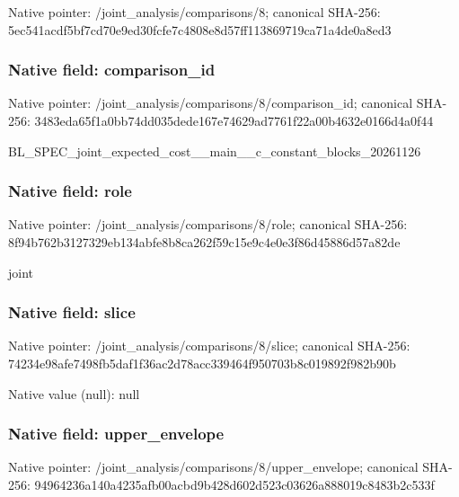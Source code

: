 \documentclass[10pt,a4paper]{article}
\begin{document}
Native pointer: /joint\_analysis/comparisons/8; canonical SHA-256: 5ec541acdf5bf7cd70e9ed30\allowbreak{}fcfe7c4808e8d57ff1138697\allowbreak{}19ca71a4de0a8ed3



\subsubsection{Native field: comparison\_id}


Native pointer: /joint\_analysis/comparis\allowbreak{}ons/8/comparison\_id; canonical SHA-256: 3483eda65f1a0bb74dd035de\allowbreak{}de167e74629ad7761f22a00b\allowbreak{}4632e0166d4a0f44


BL\_SPEC\_joint\_expected\_c\allowbreak{}ost\_\_main\_\_c\_constant\_bl\allowbreak{}ocks\_20261126


\subsubsection{Native field: role}


Native pointer: /joint\_analysis/comparisons/8/role; canonical SHA-256: 8f94b762b3127329eb134abf\allowbreak{}e8b8ca262f59c15e9c4e0e3f\allowbreak{}86d45886d57a82de


joint


\subsubsection{Native field: slice}


Native pointer: /joint\_analysis/comparisons/8/slice; canonical SHA-256: 74234e98afe7498fb5daf1f3\allowbreak{}6ac2d78acc339464f950703b\allowbreak{}8c019892f982b90b



Native value (null): null



\subsubsection{Native field: upper\_envelope}


Native pointer: /joint\_analysis/comparis\allowbreak{}ons/8/upper\_envelope; canonical SHA-256: 94964236a140a4235afb00ac\allowbreak{}bd9b428d602d523c03626a88\allowbreak{}8019c8483b2c533f
\end{document}
